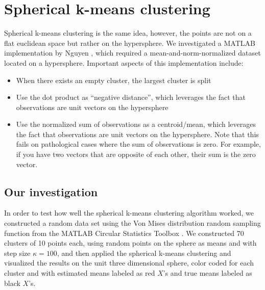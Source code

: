 \documentclass[../tech_report_1.tex]{subfiles}
\begin{document}
\section{Spherical k-means clustering}

Spherical k-means clustering is the same idea, however, the points are not on a flat euclidean space but rather on the hypersphere.
We investigated a MATLAB implementation by Nguyen  \cite{nguyen2008gene,nguyen_spherical_clustering},
which required a mean-and-norm-normalized dataset located on a hypersphere.
Important aspects of this implementation include:
\begin{itemize}
\item When there exists an empty cluster, the largest cluster is split
\item Use the dot product as ``negative distance'', which leverages the
fact that observations are unit vectors on the hypersphere
\item Use the normalized sum of observations as a centroid/mean, which leverages
the fact that observations are unit vectors on the hypersphere. Note
that this fails on pathological cases where the sum of observations
is zero.
For example, if you have two vectors that are opposite of each other, their sum is the zero vector.
\end{itemize}

\subsection{Our investigation}

In order to test how well the spherical k-means clustering algorithm
worked, we constructed a random data set using the Von Mises distribution
random sampling function from the MATLAB Circular Statistics Toolbox  \cite{circstats}.
We constructed 70 clusters of 10 points each, using random points
on the sphere as means and with step size $\kappa=100$, and then applied the spherical k-means clustering and visualized the results on the unit
three dimensional sphere, color coded for each cluster and with estimated
means labeled as red $X$'s and true means labeled as black $X$'s.


\end{document}
